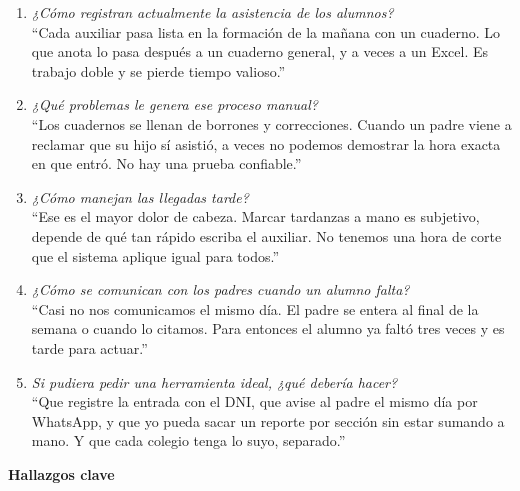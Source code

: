 \documentclass[a4paper,12pt]{article}
\begin{document}
\begin{enumerate}[leftmargin=*, label=\textbf{P\arabic*.}]
  \item \textit{¿Cómo registran actualmente la asistencia de los alumnos?}\\
  ``Cada auxiliar pasa lista en la formación de la mañana con un cuaderno. Lo
  que anota lo pasa después a un cuaderno general, y a veces a un Excel. Es
  trabajo doble y se pierde tiempo valioso.''

  \item \textit{¿Qué problemas le genera ese proceso manual?}\\
  ``Los cuadernos se llenan de borrones y correcciones. Cuando un padre viene
  a reclamar que su hijo sí asistió, a veces no podemos demostrar la hora
  exacta en que entró. No hay una prueba confiable.''

  \item \textit{¿Cómo manejan las llegadas tarde?}\\
  ``Ese es el mayor dolor de cabeza. Marcar tardanzas a mano es subjetivo,
  depende de qué tan rápido escriba el auxiliar. No tenemos una hora de corte
  que el sistema aplique igual para todos.''

  \item \textit{¿Cómo se comunican con los padres cuando un alumno falta?}\\
  ``Casi no nos comunicamos el mismo día. El padre se entera al final de la
  semana o cuando lo citamos. Para entonces el alumno ya faltó tres veces y es
  tarde para actuar.''

  \item \textit{Si pudiera pedir una herramienta ideal, ¿qué debería hacer?}\\
  ``Que registre la entrada con el DNI, que avise al padre el mismo día por
  WhatsApp, y que yo pueda sacar un reporte por sección sin estar sumando a
  mano. Y que cada colegio tenga lo suyo, separado.''
\end{enumerate}

\vspace{0.2cm}
\noindent\textbf{Hallazgos clave}
\end{document}
